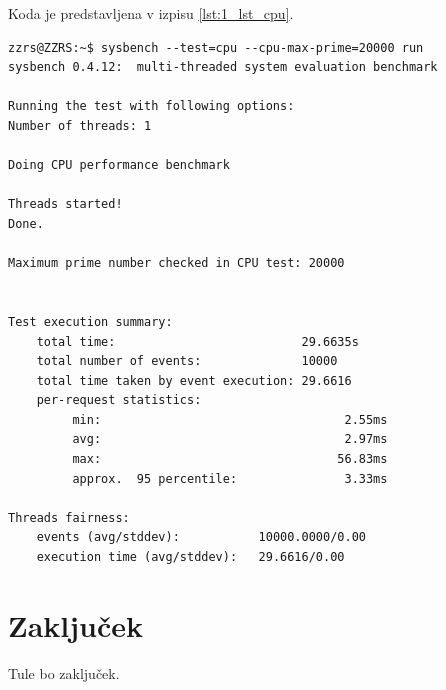 Koda je predstavljena v izpisu \ref{lst:1_lst_cpu}.
\begin{lstlisting}[caption={Primer testiranja procesorja.}, label={lst:1_lst_cpu}]
zzrs@ZZRS:~$ sysbench --test=cpu --cpu-max-prime=20000 run
sysbench 0.4.12:  multi-threaded system evaluation benchmark

Running the test with following options:
Number of threads: 1

Doing CPU performance benchmark

Threads started!
Done.

Maximum prime number checked in CPU test: 20000


Test execution summary:
    total time:                          29.6635s
    total number of events:              10000
    total time taken by event execution: 29.6616
    per-request statistics:
         min:                                  2.55ms
         avg:                                  2.97ms
         max:                                 56.83ms
         approx.  95 percentile:               3.33ms

Threads fairness:
    events (avg/stddev):           10000.0000/0.00
    execution time (avg/stddev):   29.6616/0.00
\end{lstlisting}


\section{Zaključek}
Tule bo zaključek.


